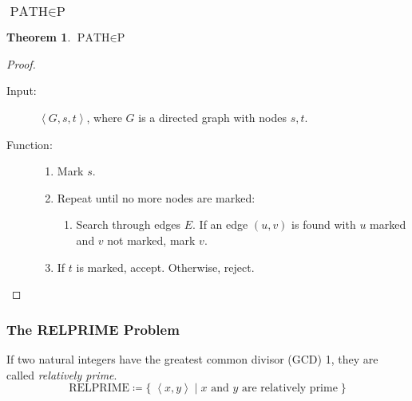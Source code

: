 \documentclass[notheorems]{beamer}
\theoremstyle{definition}
\newtheorem{theorem}{Theorem}
\theoremstyle{remark}
\newcommand{\pclass}{\text{P}}
\newcommand{\pathprob}{\text{PATH}}
\newcommand{\relprimeprob}{\text{RELPRIME}}
\newcommand{\lpp}{\left \langle}
\newcommand{\rpp}{\right \rangle}
\newcommand{\enc}[1]{\lpp #1 \rpp }
\begin{document}
    \begin{frame}
        \frametitle{\(\pathprob \in \pclass\)}
        \begin{theorem}
            \(\pathprob \in \pclass\)
        \end{theorem}
        \pause
        \begin{proof}
            \begin{description}
                \item[Input:] \(\enc{G, s, t}\), where \(G\) is a directed graph with nodes \(s, t\).
                \item[Function:] \phantom{} \begin{enumerate}[label=\arabic*.]
                    \item Mark \(s\).
                    \item Repeat until no more nodes are marked:
                    \begin{enumerate}[label=2.\arabic*.]
                        \item Search through edges \(E\). If an edge \((u, v)\) is found with \(u\) marked and \(v\) not marked, mark \(v\).
                    \end{enumerate}
                    \item If \(t\) is marked, accept. Otherwise, reject.
                \end{enumerate}
            \end{description}
        \end{proof}
    \end{frame}

    \begin{frame}
        \frametitle{The RELPRIME Problem}
        If two natural integers have the greatest common divisor (GCD) 1, they are called \emph{relatively prime}. 
        \pause
        \[
            \relprimeprob \coloneqq \{ \; \enc{x, y} \mid x \text{ and } y \text{ are relatively prime} \; \}
        \]
    \end{frame}
\end{document}
